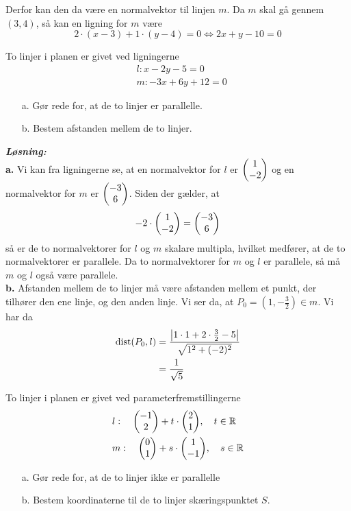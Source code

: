 \documentclass{article}
\newcommand{\sol}{\setlength{\parindent}{0cm}\textbf{\textit{Løsning:}}\setlength{\parindent}{1cm}}
\begin{document}
Derfor kan den da være en normalvektor til linjen $m$.
Da $m$ skal gå gennem $(3,4)$, så kan en ligning for $m$ være 
\[
2 \cdot \left(x-3\right) + 1 \cdot \left(y-4\right) =0 \iff 2x+y-10=0
\] 
\begin{question}{}{}
  To linjer i planen er givet ved ligningerne
  \begin{equation*}
  \begin{split}
    &l: x-2y-5=0 \\
    &m: -3x +6y+12=0
  \end{split}
  \end{equation*}
  \begin{itemize}
    \item[a.] Gør rede for, at de to linjer er parallelle.
    \item[b.] Bestem afstanden mellem de to linjer.
  \end{itemize}
\end{question}
\sol \\
\textbf{a.}
Vi kan fra ligningerne se, at en normalvektor for $l$ er $\mqty(1\\ -2) $ og en normalvektor for $m$ er $\mqty(-3\\ 6) $. 
Siden der gælder, at
\[
-2 \cdot \mqty(1\\ -2) =\mqty(-3\\ 6) 
\] 
så er de to normalvektorer for $l$ og $m$ skalare multipla, hvilket medfører, at de to normalvektorer er parallele. 
Da to normalvektorer for $m$ og $l$ er parallele, så må $m$ og $l$ også være parallele. \\[1ex]
\textbf{b.} 
Afstanden mellem de to linjer må være afstanden mellem et punkt, der tilhører den ene linje, og den anden linje.
Vi ser da, at $P_0=(1,-\frac{3}{2})\in m$. Vi har da
\begin{equation*}
\begin{split}
  \text{dist}(P_0,l)&=\frac{\abs{1 \cdot 1 +2 \cdot \frac{3}{2}-5} }{\sqrt{1^2+(-2)^2} }\\ 
  &=\frac{1}{\sqrt{5} }
\end{split}
\end{equation*}
\begin{question}{}{}
  To linjer i planen er givet ved parameterfremstillingerne
  \begin{equation*}
  \begin{split}
    &l:\quad \mqty(-1\\ 2) +t \cdot \mqty(2\\ 1), \quad t \in \mathbb{R}\\
    &m:\quad \mqty(0\\ 1) + s \cdot \mqty(1\\ -1), \quad s \in \mathbb{R}
  \end{split}
  \end{equation*}
  \begin{itemize}
    \item[a.] Gør rede for, at de to linjer ikke er parallelle
    \item[b.] Bestem koordinaterne til de to linjer skæringspunktet $S$.
  \end{itemize}
\end{question}
\end{document}
